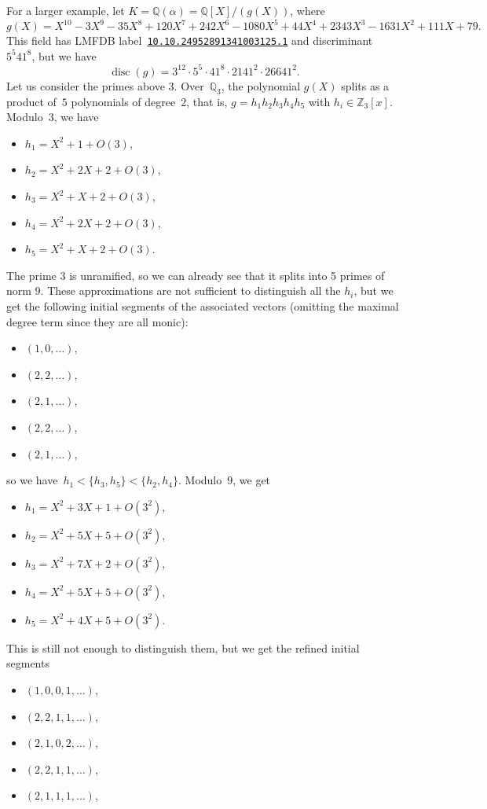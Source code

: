 \documentclass{article}
\def\Z{{\mathbb Z}}
\def\Q{{\mathbb Q}}
\DeclareMathOperator{\disc}{disc}
\begin{document}
For a larger example, let $K=\Q(\alpha)=\Q[X]/(g(X))$, where
\[
g(X)= X^{10} - 3X^9 - 35X^8 + 120X^7 + 242X^6 - 1080X^5 + 44X^4 + 2343X^3 -
1631X^2 + 111X + 79.
\]
This field has LMFDB
label~\href{http://beta.lmfdb.org/NumberField/10.10.24952891341003125.1}{\texttt{10.10.24952891341003125.1}} and discriminant~$5^5 41^8$, but we have
\[
\disc(g)=3^{12}\cdot 5^5\cdot 41^8\cdot 2141^2\cdot 26641^2.
\]
Let us consider the primes above $3$.
Over~$\Q_3$, the polynomial $g(X)$ splits as
a product of~$5$ polynomials of degree~$2$, that is, $g = h_1h_2h_3h_4h_5$ with
$h_i\in\Z_3[x]$. Modulo~$3$, we have
\begin{itemize}
  \item $h_1 = X^2 + 1 +O(3)$,
  \item $h_2 = X^2 + 2X + 2 + O(3)$,
  \item $h_3 = X^2 + X + 2 + O(3)$,
  \item $h_4 = X^2 + 2X + 2 + O(3)$,
  \item $h_5 = X^2 + X + 2 + O(3)$.
\end{itemize}
The prime $3$ is unramified, so we can already see that it splits into 5 primes of norm $9$.  These approximations are not sufficient to distinguish all the $h_i$,
but we get the following initial segments of the associated vectors (omitting
the maximal degree term since they are all monic):
\begin{itemize}
  \item $(1,0,\dots)$,
  \item $(2,2,\dots)$,
  \item $(2,1,\dots)$,
  \item $(2,2,\dots)$,
  \item $(2,1,\dots)$,
\end{itemize}
so we have~$h_1 < \{h_3,h_5\} < \{h_2,h_4\}$. Modulo~$9$, we get
\begin{itemize}
  \item $h_1 = X^2 + 3X + 1 + O(3^2)$,
  \item $h_2 = X^2 + 5X + 5 + O(3^2)$,
  \item $h_3 = X^2 + 7X + 2 + O(3^2)$,
  \item $h_4 = X^2 + 5X + 5 + O(3^2)$,
  \item $h_5 = X^2 + 4X + 5 + O(3^2)$.
\end{itemize}
This is still not enough to distinguish them, but
we get the refined initial segments
\begin{itemize}
  \item $(1,0,0,1,\dots)$,
  \item $(2,2,1,1,\dots)$,
  \item $(2,1,0,2,\dots)$,
  \item $(2,2,1,1,\dots)$,
  \item $(2,1,1,1,\dots)$,
\end{itemize}
\end{document}

